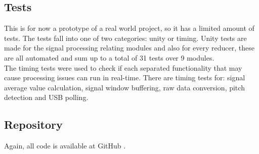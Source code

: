 \subsection{Tests}
This is for now a prototype of a real world project, so it has a limited amount
of tests. The tests fall into one of two categories: unity or timing. Unity tests
are made for the signal processing relating modules and also for every reducer,
these are all automated and sum up to a total of 31 tests over 9 modules. \\
The timing tests were used to check if each separated functionality that may
cause processing issues can run in real-time. There are timing tests for: signal
average value calculation, signal window buffering, raw data conversion,
pitch detection and USB polling.

\subsection{Repository}
Again, all code is available at GitHub \cite{guitar-digitizer}.
